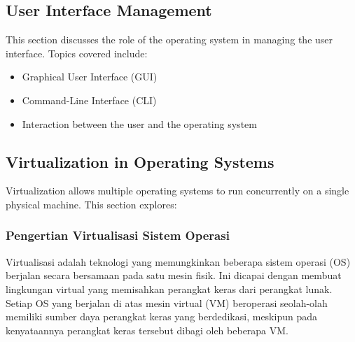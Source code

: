 \documentclass[12pt]{article}
\begin{document}
\subsection{User Interface Management}
This section discusses the role of the operating system in managing the user interface. Topics covered include:
\begin{itemize}
    \item Graphical User Interface (GUI)
    \item Command-Line Interface (CLI)
    \item Interaction between the user and the operating system
\end{itemize}

\subsection{Virtualization in Operating Systems}
Virtualization allows multiple operating systems to run concurrently on a single physical machine. This section explores:
\subsubsection{Pengertian Virtualisasi Sistem Operasi}
    \par Virtualisasi adalah teknologi yang memungkinkan beberapa sistem operasi (OS) berjalan secara bersamaan pada satu mesin fisik. Ini dicapai dengan membuat lingkungan virtual yang memisahkan perangkat keras dari perangkat lunak. Setiap OS yang berjalan di atas mesin virtual (VM) beroperasi seolah-olah memiliki sumber daya perangkat keras yang berdedikasi, meskipun pada kenyataannya perangkat keras tersebut dibagi oleh beberapa VM.
\end{document}
